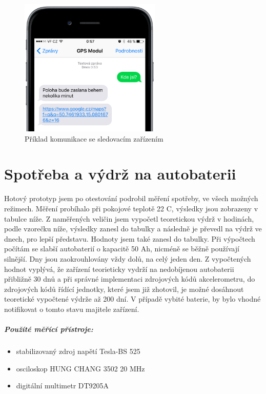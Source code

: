 \documentclass[FM,MP]{tulthesis}  %
\begin{document}
\begin{figure}[H]
\begin{center}
\includegraphics[width=0.6\textwidth]{images/comm.png}
\caption{Příklad komunikace se sledovacím zařízením}
\label{image}
\end{center}
\end{figure}


\chapter{Spotřeba a výdrž na autobaterii}
Hotový prototyp jsem po otestování podrobil měření spotřeby, ve všech možných režimech. Měření probíhalo při pokojové teplotě 22 \degree C, výsledky jsou zobrazeny v tabulce níže. Z naměřených veličin jsem vypočetl teoretickou výdrž v hodinách, podle vzorečku níže, výsledky zanesl do tabulky a následně je převedl na výdrž ve dnech, pro lepší představu. Hodnoty jsem také zanesl do tabulky. Při výpočtech počítám se slabší autobaterií o kapacitě 50 Ah, nicméně se běžně používají silnější. Dny jsou zaokrouhlovány vždy dolů, na celý jeden den. Z vypočtených hodnot vyplývá, že zařízení teorieticky vydrží na nedobíjenou autobaterii přibližně 30 dnů a při správné implementaci zdrojových kódů akcelerometru, do zdrojových kódů řídící jednotky, které jsem již zhotovil, je možné dosáhnout teoretické vypočtené výdrže až 200 dní. V případě vybité baterie, by bylo vhodné notifikovat o tomto stavu majitele zařízení.

\paragraph{Použíté měřící přístroje:}
\begin{itemize}
\item stabilizovaný zdroj napětí Tesla-BS 525
\item osciloskop HUNG CHANG 3502 20 MHz
\item digitální multimetr DT9205A
\end{itemize}
\end{document}
